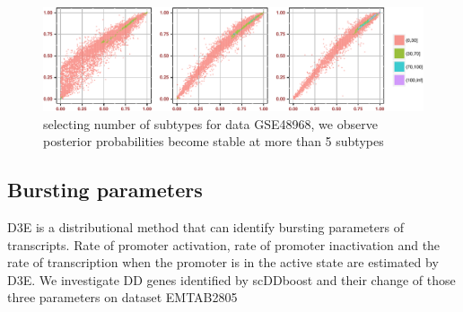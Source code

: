 \documentclass[11pt]{amsart}
\begin{document}
\begin{figure}[H]

\includegraphics[width = 1\textwidth]{Figs/s_789_GSE48968.pdf}

\caption{selecting number of subtypes for data GSE48968, we observe posterior probabilities become stable at more than 5 subtypes}
\end{figure}


\subsection{Bursting parameters}
D3E\cite{ref:d3e} is a distributional method that can identify bursting parameters of transcripts. Rate of promoter activation, rate of promoter inactivation and the rate of transcription when the promoter is in the active state are estimated by D3E.  We investigate DD genes identified by scDDboost and their change of those three parameters on dataset EMTAB2805\\
\end{document}
